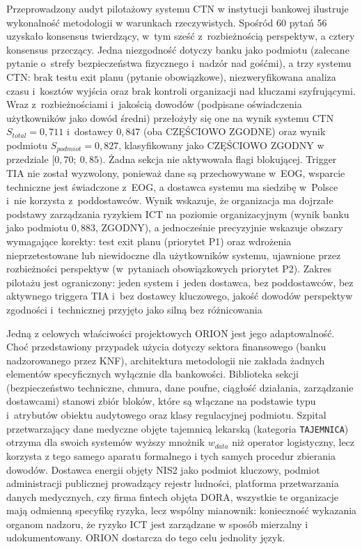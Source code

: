 Przeprowadzony audyt pilotażowy systemu CTN w instytucji bankowej ilustruje wykonalność metodologii w warunkach rzeczywistych. Spośród 60 pytań 56 uzyskało konsensus twierdzący, w~tym sześć z~rozbieżnością perspektyw, a cztery konsensus przeczący. Jedna niezgodność dotyczy banku jako podmiotu (zalecane pytanie o~strefy bezpieczeństwa fizycznego i~nadzór nad gośćmi), a trzy systemu CTN: brak testu exit planu (pytanie obowiązkowe), niezweryfikowana analiza czasu i~kosztów wyjścia oraz brak kontroli organizacji nad kluczami szyfrującymi. Wraz z~rozbieżnościami i~jakością dowodów (podpisane oświadczenia użytkowników jako dowód średni) przełożyły się one na wynik systemu CTN $S_{total} = 0{,}711$ i~dostawcy $0{,}847$ (oba CZĘŚCIOWO ZGODNE) oraz wynik podmiotu $S_{podmiot} = 0{,}827$, klasyfikowany jako CZĘŚCIOWO ZGODNY w przedziale $[0{,}70;\ 0{,}85)$. Żadna sekcja nie aktywowała flagi blokującej. Trigger TIA nie został wyzwolony, ponieważ dane są przechowywane w~EOG, wsparcie techniczne jest świadczone z~EOG, a dostawca systemu ma siedzibę w~Polsce i~nie korzysta z~poddostawców. Wynik wskazuje, że organizacja ma dojrzałe podstawy zarządzania ryzykiem ICT na poziomie organizacyjnym (wynik banku jako podmiotu $0{,}883$, ZGODNY), a jednocześnie precyzyjnie wskazuje obszary wymagające korekty: test exit planu (priorytet P1) oraz wdrożenia nieprzetestowane lub niewidoczne dla użytkowników systemu, ujawnione przez rozbieżności perspektyw (w~pytaniach obowiązkowych priorytet P2). Zakres pilotażu jest ograniczony: jeden system i~jeden dostawca, bez poddostawców, bez aktywnego triggera TIA i~bez dostawcy kluczowego, jakość dowodów perspektyw zgodności i~technicznej przyjęto jako silną bez różnicowania

Jedną z celowych właściwości projektowych ORION jest jego adaptowalność. Choć przedstawiony przypadek użycia dotyczy sektora finansowego (banku nadzorowanego przez KNF), architektura metodologii nie zakłada żadnych elementów specyficznych wyłącznie dla bankowości. Biblioteka sekcji (bezpieczeństwo techniczne, chmura, dane poufne, ciągłość działania, zarządzanie dostawcami) stanowi zbiór bloków, które są włączane na podstawie typu i~atrybutów obiektu audytowego oraz klasy regulacyjnej podmiotu. Szpital przetwarzający dane medyczne objęte tajemnicą lekarską (kategoria \texttt{TAJEMNICA}) otrzyma dla swoich systemów wyższy mnożnik $w_{data}$ niż operator logistyczny, lecz korzysta z tego samego aparatu formalnego i tych samych procedur zbierania dowodów. Dostawca energii objęty NIS2 jako podmiot kluczowy, podmiot administracji publicznej prowadzący rejestr ludności, platforma przetwarzania danych medycznych, czy firma fintech objęta DORA, wszystkie te organizacje mają odmienną specyfikę ryzyka, lecz wspólny mianownik: konieczność wykazania organom nadzoru, że ryzyko ICT jest zarządzane w sposób mierzalny i udokumentowany. ORION dostarcza do tego celu jednolity język.


